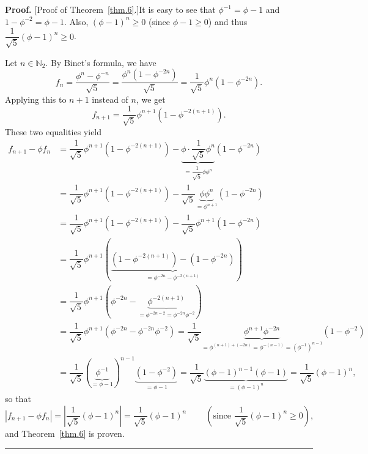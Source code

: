 \documentclass[numbers=enddot,12pt,final,onecolumn,notitlepage]{scrartcl}%
\numberwithin{exer}{section}
\theoremstyle{definition}
\newenvironment{proof}[1][Proof]{\noindent\textbf{#1.} }{\ \rule{0.5em}{0.5em}}
\begin{document}
\begin{proof}
[Proof of Theorem~\ref{thm.6}.]It is easy to see that $\phi^{-1}=\phi-1$ and
$1-\phi^{-2}=\phi-1$. Also, $\left(  \phi-1\right)  ^{n} \geq0$ (since $\phi-1
\geq0$) and thus $\dfrac{1}{\sqrt{5}} \left(  \phi-1\right)  ^{n} \geq0$.

Let $n\in\mathbb{N}_{2}$. By Binet's formula, we have%
\[
f_{n}=\dfrac{\phi^{n}-\phi^{-n}}{\sqrt{5}}=\dfrac{\phi^{n}\left(  1-\phi
^{-2n}\right)  }{\sqrt{5}}=\dfrac{1}{\sqrt{5}}\phi^{n}\left(  1-\phi
^{-2n}\right)  .
\]
Applying this to $n+1$ instead of $n$, we get%
\[
f_{n+1}=\dfrac{1}{\sqrt{5}}\phi^{n+1}\left(  1-\phi^{-2\left(  n+1\right)
}\right)  .
\]
These two equalities yield%
\begin{align*}
f_{n+1}-\phi f_{n}  &  =\dfrac{1}{\sqrt{5}}\phi^{n+1}\left(  1-\phi^{-2\left(
n+1\right)  }\right)  -\underbrace{\phi\cdot\dfrac{1}{\sqrt{5}}\phi^{n}%
}_{=\dfrac{1}{\sqrt{5}}\phi\phi^{n}}\left(  1-\phi^{-2n}\right) \\
&  =\dfrac{1}{\sqrt{5}}\phi^{n+1}\left(  1-\phi^{-2\left(  n+1\right)
}\right)  -\dfrac{1}{\sqrt{5}}\underbrace{\phi\phi^{n}}_{=\phi^{n+1}}\left(
1-\phi^{-2n}\right) \\
&  =\dfrac{1}{\sqrt{5}}\phi^{n+1}\left(  1-\phi^{-2\left(  n+1\right)
}\right)  -\dfrac{1}{\sqrt{5}}\phi^{n+1}\left(  1-\phi^{-2n}\right) \\
&  =\dfrac{1}{\sqrt{5}}\phi^{n+1}\left(  \underbrace{\left(  1-\phi^{-2\left(
n+1\right)  }\right)  -\left(  1-\phi^{-2n}\right)  }_{=\phi^{-2n}%
-\phi^{-2\left(  n+1\right)  }}\right) \\
&  =\dfrac{1}{\sqrt{5}}\phi^{n+1}\left(  \phi^{-2n}-\underbrace{\phi
^{-2\left(  n+1\right)  }}_{=\phi^{-2n-2}=\phi^{-2n}\phi^{-2}}\right) \\
&  =\dfrac{1}{\sqrt{5}}\phi^{n+1}\left(  \phi^{-2n}-\phi^{-2n}\phi
^{-2}\right)  =\dfrac{1}{\sqrt{5}}\underbrace{\phi^{n+1}\phi^{-2n}}%
_{=\phi^{\left(  n+1\right)  +\left(  -2n\right)  }=\phi^{-\left(  n-1\right)
}=\left(  \phi^{-1}\right)  ^{n-1}}\left(  1-\phi^{-2}\right) \\
&  =\dfrac{1}{\sqrt{5}}\left(  \underbrace{\phi^{-1}}_{=\phi-1}\right)
^{n-1}\underbrace{\left(  1-\phi^{-2}\right)  }_{=\phi-1}=\dfrac{1}{\sqrt{5}%
}\underbrace{\left(  \phi-1\right)  ^{n-1}\left(  \phi-1\right)  }_{=\left(
\phi-1\right)  ^{n}}=\dfrac{1}{\sqrt{5}}\left(  \phi-1\right)  ^{n},
\end{align*}
so that%
\[
\left\vert f_{n+1}-\phi f_{n}\right\vert =\left\vert \dfrac{1}{\sqrt{5}%
}\left(  \phi-1\right)  ^{n}\right\vert =\dfrac{1}{\sqrt{5}}\left(
\phi-1\right)  ^{n}\ \ \ \ \ \ \ \ \ \ \left(  \text{since }\dfrac{1}{\sqrt
{5}}\left(  \phi-1\right)  ^{n}\geq0\right)  ,
\]
and Theorem~\ref{thm.6} is proven.
\end{proof}
\end{document}

